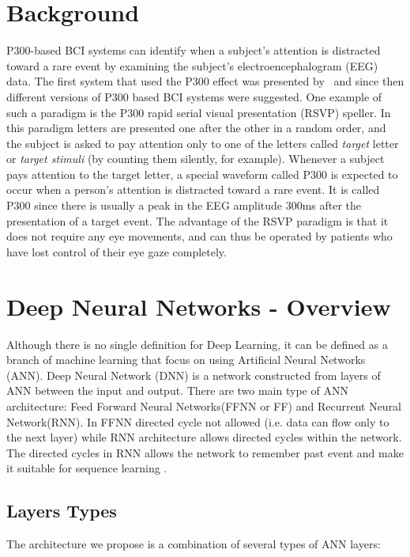 \documentclass[
12pt, %
english, %
doublespacing, %
headsepline, %
]{MastersDoctoralThesis} %
\begin{document}
\vspace{0.4cm}
\section{Background}
\vspace{0.4cm}

P300-based BCI systems can identify when a subject's attention is distracted toward a rare event by examining the subject's electroencephalogram (EEG) data. The first system that used the P300 effect was presented by~\cite{FirstP300} and since then different versions of P300 based BCI systems were suggested. One example of such a paradigm is the P300 rapid serial visual presentation (RSVP) speller. In this paradigm letters are presented one after the other in a random order, and the subject is asked to pay attention only to one of the letters called \textit{target} letter or \textit{target stimuli} (by counting them silently, for example). Whenever a subject pays attention to the target letter, a special waveform called P300 is expected to occur when a person's attention is distracted toward a rare event. It is called P300 since there is usually a peak in the EEG amplitude 300ms after the presentation of a target event. The advantage of the RSVP paradigm is that it does not require any eye movements, and can thus be operated by patients who have lost control of their eye gaze completely.

\section{Deep Neural Networks - Overview}

Although there is no single definition for Deep Learning, it can be defined as a branch of machine learning that focus on using Artificial Neural Networks (ANN). Deep Neural Network (DNN) is a network constructed from layers of ANN between the input and output. There are two main type of ANN architecture: Feed Forward Neural Networks(FFNN or FF) and Recurrent Neural Network(RNN). In FFNN directed cycle not allowed (i.e. data can flow only to the next layer)  while RNN architecture allows directed cycles within the network. The directed cycles in RNN allows the network to remember past event and make it suitable for sequence learning \cite{rumelhart1985learning}.



\subsection{Layers Types}
The architecture we propose is a combination of several types of ANN layers:
\end{document}
